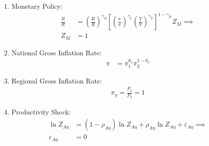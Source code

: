 \documentclass[../thesis.tex]{subfiles}
\begin{document}
\begin{enumerate}
	\begin{comment}
			\item Intermediate-goods Firms Profit:
		\begin{align}
			\Pi_{\eta} &= \int_{0}^{1} P_{\eta} Y_{\eta j} - W_{\eta} L_{\eta j} \dif j \label{eq_v6:reg-ss-int-good-firm-profit-total-2}
		\end{align}
		
	\end{comment}
	

	
	\item Monetary Policy:
	\begin{align}
		\frac{R_{}}{R_{}} &= \left( \frac{R_{}}{R_{}} \right)^{\gamma_{R}} \left[ \left( \frac{\pi_{}}{\pi_{}} \right)^{\gamma_{\pi}} \left( \frac{Y_{}}{Y_{}} \right)^{\gamma_{Y}} \right]^{1-\gamma_{R}} Z_{M} \implies \nonumber \\
		Z_{M} &= 1 \label{eq_v6:reg-ss-monetary-policy}
	\end{align}
	
	\item National Gross Inflation Rate:
	\begin{align}
		\pi_{} &= \pi_{1}^{\theta_{\pi}} \pi_{2}^{1 - \theta_{\pi}} \label{eq_v6:reg-ss-gross-inflation-rate}
	\end{align}
	
	\begin{comment}
		\item National Price Level:
		\begin{align}
			P_{} &= \frac{P_{1} Y_{1} + P_{2} Y_{2}}{Y_{}} \label{eq_v6:reg-ss-national-price-level} %
		\end{align}	
	\end{comment}
	
	
	
	\item Regional Gross Inflation Rate:
	\begin{align}
		\pi_{\eta} = \frac{P_{\eta}}{P_{\eta}} = 1 \label{eq_v6:reg-ss-regional-inflation}
	\end{align}
	
	\item Productivity Shock:
	\begin{align}
		\ln{Z_{A\eta}} &= (1-\rho_{A\eta}) \ln{Z_{A\eta}} + \rho_{A\eta} \ln{Z_{A\eta}} + \varepsilon_{A\eta} \implies \nonumber \\
		\varepsilon_{A\eta} &= 0 \label{eq_v6:reg-ss-productivity-shock}
	\end{align}
	

\end{enumerate}
\end{document}

